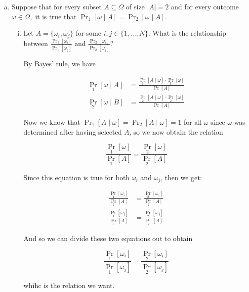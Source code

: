 \documentclass[11pt]{article}
\begin{document}
\begin{enumerate}[(a)]
    \item Suppose that for every subset $A\subseteq \Omega$ of size $|A| = 2$ and for every outcome $\omega\in\Omega,$ it is true that $\Pr_1[\omega \mid A] = \Pr_2[\omega \mid A]$. 

        \begin{enumerate}[(i)]
            \item Let $A = \{\omega_i, \omega_j\}$ for some $i, j \in \{1, \ldots, N\}$. What is the relationship between $\frac{\Pr_1[\omega_i]}{\Pr_1[\omega_j]}$ and $\frac{\Pr_2[\omega_i]}{\Pr_2[\omega_j]}$?
            
            \begin{solution}
                By Bayes' rule, we have 

                \begin{align*}
                    \Pr_1[\omega \mid A] &=\frac{\Pr_1[A \mid \omega] \cdot \Pr_1[\omega]}{\Pr [A]}\\
                    \Pr_2[\omega \mid B] &= \frac{\Pr_2[A \mid \omega] \cdot \Pr_2[\omega]}{\Pr[A]}
                \end{align*}

                Now we know that $\Pr_1[A \mid \omega] = \Pr_2[A \mid \omega] = 1$ for all $\omega$ since $\omega$ was determined after having selected $A$, so we now obtain the relation 

                \begin{equation}\label{relation}
                     \frac{\Pr_1[\omega]}{\Pr_1[A]} = \frac{\Pr_2[\omega]}{\Pr_2[A]}
                \end{equation}

                Since this equation is true for both $\omega_i$ and $\omega_j$, then we get: 

                \begin{align*}
                    \frac{\Pr_1[\omega_i]}{\Pr_1[A]} &= \frac{\Pr_2[\omega_i]}{\Pr_2[A]}\\
                    \frac{\Pr_1[\omega_j]}{\Pr_1[A]} &= \frac{\Pr_2[\omega_j]}{\Pr_2[A]}
                \end{align*}

                And so we can divide these two equations out to obtain 

                \[ \frac{\Pr_1[\omega_i]}{\Pr_1[\omega_j]} = \frac{\Pr_2[\omega_i]}{\Pr_2[\omega_j]}\] 

                whihc is the relation we want.



\end{solution}
\end{enumerate}
\end{enumerate}
\end{document}
